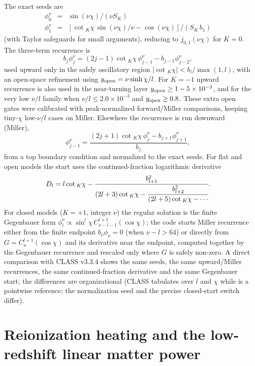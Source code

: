 \documentclass[prd, twocolumn, superscriptaddress, tightenlines, longbibliography, nofootinbib, eqsecnum, amsfonts, amsmath, floatfix, notitlepage]{revtex4-2}
\newcommand{\code}[1]{\texttt{\detokenize{#1}}}
\newcommand{\SK}{S_K}
\newcommand{\cotK}{\cot{}_K}
\begin{document}
The exact seeds are
\begin{eqnarray}
\phi_0^\nu&=&\sin(\nu\chi)/(\nu\SK) \\
\phi_1^\nu&=&[\cotK\chi\,\sin(\nu\chi)/\nu-\cos(\nu\chi)]/(\SK\,b_1)
\end{eqnarray}
 (with Taylor
safeguards for small arguments), reducing to $j_{0,1}(\nu\chi)$ for $K=0$. The
three-term recurrence is
\begin{equation}
  b_j\phi_j^\nu=(2j-1)\cotK\chi\,\phi_{j-1}^\nu-b_{j-1}\phi_{j-2}^\nu,
  \label{eq:up-recurrence}
\end{equation}
used upward only in the safely oscillatory region
$|\cotK\chi|<b_l/\max(1,l)$, with an open-space refinement using
$y_{\rm open}=\nu\sinh\chi/l$.  For $K=-1$ upward recurrence is also used in the
near-turning layer $y_{\rm open}\ge1-5\times10^{-3}$, and for the very low
$\nu/l$ family when $\nu/l\le2.0\times10^{-3}$ and $y_{\rm open}\ge0.8$.
These extra open gates were calibrated with peak-normalized forward/Miller
comparisons, keeping tiny-$\chi$ low-$\nu/l$ cases on Miller.  Elsewhere the
recurrence is run downward (Miller),
\begin{equation}
  \phi_{j-1}^\nu=\frac{(2j+1)\cotK\chi\,\phi_j^\nu-b_{j+1}\phi_{j+1}^\nu}{b_j},
  \label{eq:down-recurrence}
\end{equation}
from a top boundary condition and normalized to the exact seeds. For flat and open
models the start uses the continued-fraction logarithmic derivative
\begin{equation}
  D_l=l\cotK\chi-\cfrac{b_{l+1}^2}{(2l+3)\cotK\chi-\cfrac{b_{l+2}^2}{(2l+5)\cotK\chi-\cdots}} .
\end{equation}
For closed models ($K=+1$, integer $\nu$) the regular solution is the finite
Gegenbauer form $\phi_l^\nu\propto\sin^l\chi\,C_{\nu-l-1}^{l+1}(\cos\chi)$; the
code starts Miller recurrence either from the finite endpoint $b_\nu\phi_\nu=0$
(when $\nu-l>64$) or directly from $G=C_n^{l+1}(\cos\chi)$ and its derivative near
the endpoint, computed together by the Gegenbauer recurrence and rescaled only
where $G$ is safely non-zero. A direct comparison with \textsc{CLASS} v3.3.4 shows
the same seeds, the same upward/Miller recurrences, the same continued-fraction
derivative and the same Gegenbauer start; the differences are organizational
(\textsc{CLASS} tabulates over $l$ and $\chi$ while \code{phi_recurs} is a
pointwise reference; the normalization seed and the precise closed-start switch
differ).


\section{Reionization heating and the low-redshift linear matter power}
\label{app:reion-heating}
\end{document}

